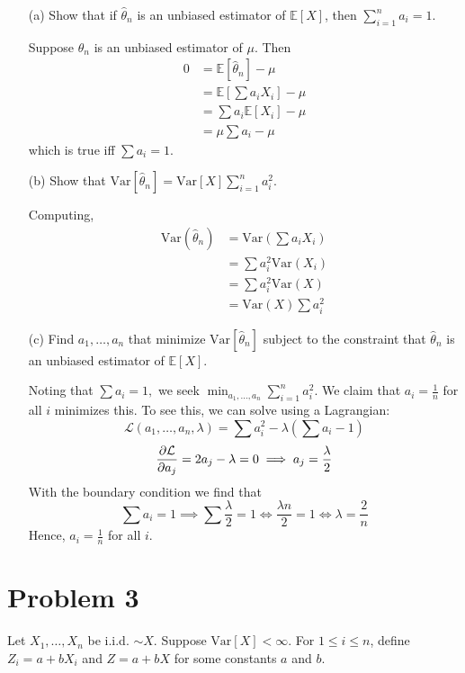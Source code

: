 \documentclass[11pt]{article}
\newcommand{\Var}{\text{Var}}
\newcommand{\bbE}{\mathbb{E}}
\begin{document}
\begin{enumerate}
    \item[(a)] Show that if \( \hat{\theta}_n \) is an unbiased estimator of \( \mathbb{E}[X] \), then \( \sum_{i=1}^n a_i = 1 \).
\begin{solution}
Suppose $\hat{\theta}_n$ is an unbiased estimator of $\mu.$ Then 
\begin{align*}
    0&= \bbE[\hat{\theta}_n] - \mu\\
    &= \bbE[\sum a_i X_i]- \mu\\
    &= \sum a_i \bbE[X_i] - \mu\\
    &= \mu \sum a_i  - \mu
\end{align*}
which is true iff $\sum a_i = 1.$
\end{solution}
    \item[(b)] Show that \( \text{Var}[\hat{\theta}_n] = \text{Var}[X] \sum_{i=1}^n a_i^2 \).
\begin{solution}
    Computing, 
    \begin{align*}
        \Var(\hat{\theta}_n) &= \Var(\sum a_i X_i)\\
        &= \sum a_i^2 \Var(X_i)\\
        &=  \sum a_i^2 \Var(X)\\
        &= \Var(X) \sum a_i^2
    \end{align*}
\end{solution}
    \item[(c)] Find \( a_1, \ldots, a_n \) that minimize \( \text{Var}[\hat{\theta}_n] \) subject to the constraint that \( \hat{\theta}_n \) is an unbiased estimator of \( \mathbb{E}[X] \).
    \begin{solution}
        Noting that $\sum a_i = 1,$ we seek $\min_{a_1, \dots, a_n} \sum_{i=1}^n a_i^2.$ We claim that $a_i = \frac{1}{n}$ for all $i$ minimizes this. To see this, we can  solve using a Lagrangian: 
        \[\mathcal{L}(a_1, \dots, a_n, \lambda) = \sum a_i^2 - \lambda(\sum a_i - 1)\]
        \[\frac{\partial \cal L}{\partial a_j} = 2a_j - \lambda = 0  \implies a_j = \frac{\lambda}{2} \] With the boundary condition we find that 
        \[\sum a_i = 1 \implies \sum \frac{\lambda}{2} = 1 \iff \frac{\lambda n}{2} = 1 \iff \lambda = \frac{2}{n}\] Hence, $a_i = \frac{1}{n}$ for all $i.$ 
    \end{solution}
\end{enumerate}

\newpage
\section*{Problem 3}
Let \( X_1, \ldots, X_n \) be i.i.d. \( \sim X \). Suppose \( \text{Var}[X] < \infty \). For \( 1 \leq i \leq n \), define \( Z_i = a + bX_i \) and \( Z = a + bX \) for some constants \( a \) and \( b \).
\end{document}
